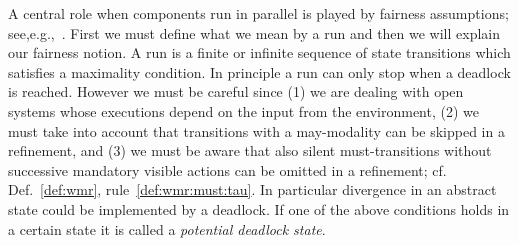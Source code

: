 
A central role when components run in parallel is played by fairness assumptions; see,e.g.,~\cite{berard-et-al-2001}.
First we must define what we mean by a run and then we will explain our fairness notion.
A run is a finite or infinite sequence of state transitions which satisfies a maximality condition.
In principle a run can only stop when a deadlock is reached. However we must be careful
since (1) we are dealing with open systems whose executions depend on the input from the environment,
(2) we must take into account that transitions with a may-modality can be skipped in a refinement,
and (3) we must be aware that also silent must-transitions without successive mandatory visible actions
can be omitted in a refinement; cf. Def.~\ref{def:wmr}, rule~\ref{def:wmr:must:tau}.
In particular divergence in an abstract state could be implemented by a deadlock.
If one of the above conditions holds in a certain state it is called a \emph{potential deadlock state}.

